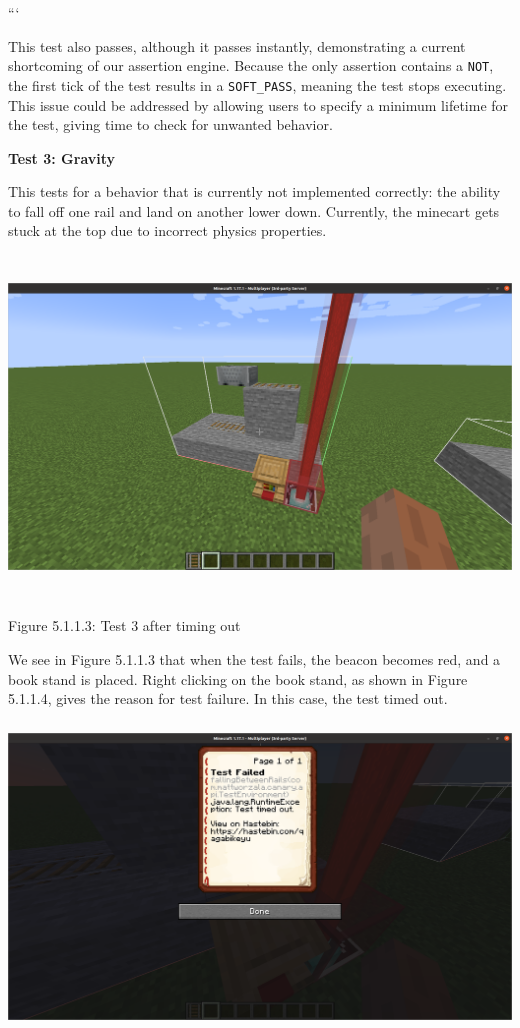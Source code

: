 \documentclass{article}
\def\code#1{\texttt{#1}}
\begin{document}
\begin{onehalfspacing}
```

This test also passes, although it passes instantly, demonstrating a
current shortcoming of our assertion engine. Because the only assertion
contains a \code{NOT}, the first tick of the test results in a \code{SOFT\_PASS},
meaning the test stops executing. This issue could be addressed by
allowing users to specify a minimum lifetime for the test, giving time
to check for unwanted behavior.

\textbf{Test 3: Gravity}

This tests for a behavior that is currently not implemented correctly:
the ability to fall off one rail and land on another lower down.
Currently, the minecart gets stuck at the top due to incorrect physics
properties.

\includegraphics[width=6.5in,height=3.57052in]{media/media/image10.png}

Figure 5.1.1.3: Test 3 after timing out

We see in Figure 5.1.1.3 that when the test fails, the beacon becomes
red, and a book stand is placed. Right clicking on the book stand, as
shown in Figure 5.1.1.4, gives the reason for test failure. In this
case, the test timed out.

\includegraphics[width=5.8125in,height=3.20414in]{media/media/image14.png}


\end{onehalfspacing}
\end{document}
